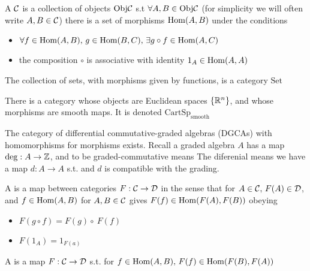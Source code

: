 \documentclass{article}
\begin{document}
\begin{definition}
	A  $\mathcal{C}$ is a collection of objects $\text{Obj}\mathcal{C}$ s.t $\forall A,B \in  \text{Obj}\mathcal{C}$ (for simplicity we will often write $A,B \in \mathcal{C}$) there is a set of morphisms $\operatorname{Hom}(A,B)$ under the conditions
	\begin{itemize}
		\item $\forall f \in \operatorname{Hom}(A,B), \, g \in \operatorname{Hom}(B,C), \, \exists g \circ f \in \operatorname{Hom}(A,C)$
		\item the composition $\circ$ is associative with identity $1_A \in \operatorname{Hom}(A,A)$
	\end{itemize}
\end{definition}

\begin{example}
	The collection of sets, with morphisms given by functions, is a category $\text{Set}$
\end{example}

\begin{example}
	There is a category whose objects are Euclidean spaces $\left\{ \mathbb{R}^n \right\}$, and whose morphisms are smooth maps. It is denoted $\text{CartSp}_{\text{smooth}}$
\end{example}

\begin{example}
	The category of differential commutative-graded algebras (DGCAs) with homomorphisms for morphisms exists. Recall a graded algebra $A$ has a map $\deg : A \to \mathbb{Z}$, and to be graded-commutative means 
The diferenial means we have a map $d:A \to A$ s.t. 
and $d$ is compatible with the grading.
\end{example}

\begin{definition}
	A  is a map between categories $F: \mathcal{C} \to \mathcal{D}$ in the sense that for $A \in \mathcal{C}, \, F(A) \in \mathcal{D}$, and $f \in \operatorname{Hom}(A,B)$ for $A,B \in \mathcal{C}$ gives $F(f) \in \operatorname{Hom}(F(A), F(B))$ obeying 
	\begin{itemize}
		\item $F(g \circ f) = F(g) \circ ~F(f)$ 
		\item $F(1_A) = 1_{F(a)}$
	\end{itemize}
A  is a map $F:\mathcal{C} \to \mathcal{D}$ s.t. for $f \in \operatorname{Hom}(A,B), \, F(f) \in \operatorname{Hom}(F(B),F(A))$
\end{definition}
\end{document}
